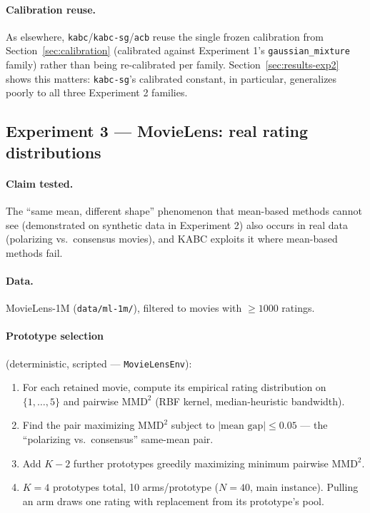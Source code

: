 \documentclass[11pt]{article}
\begin{document}
\paragraph{Calibration reuse.} As elsewhere, \texttt{kabc}/\texttt{kabc-sg}/\texttt{acb}
reuse the single frozen calibration from Section~\ref{sec:calibration}
(calibrated against Experiment 1's \texttt{gaussian\_mixture} family) rather
than being re-calibrated per family. Section~\ref{sec:results-exp2} shows this
matters: \texttt{kabc-sg}'s calibrated constant, in particular, generalizes
poorly to all three Experiment 2 families.

\subsection{Experiment 3 --- MovieLens: real rating distributions}

\paragraph{Claim tested.} The ``same mean, different shape'' phenomenon that
mean-based methods cannot see (demonstrated on synthetic data in Experiment 2)
also occurs in real data (polarizing vs.\ consensus movies), and KABC exploits it
where mean-based methods fail.

\paragraph{Data.} MovieLens-1M (\texttt{data/ml-1m/}), filtered to movies with
$\ge 1000$ ratings.

\paragraph{Prototype selection} (deterministic, scripted --- \texttt{MovieLensEnv}):
\begin{enumerate}
  \item For each retained movie, compute its empirical rating distribution on
    $\{1,\ldots,5\}$ and pairwise $\mathrm{MMD}^2$ (RBF kernel, median-heuristic
    bandwidth).
  \item Find the pair maximizing $\mathrm{MMD}^2$ subject to $|\text{mean gap}| \le
    0.05$ --- the ``polarizing vs.\ consensus'' same-mean pair.
  \item Add $K-2$ further prototypes greedily maximizing minimum pairwise
    $\mathrm{MMD}^2$.
  \item $K=4$ prototypes total, 10 arms/prototype ($N=40$, main instance). Pulling
    an arm draws one rating with replacement from its prototype's pool.
\end{enumerate}
\end{document}
